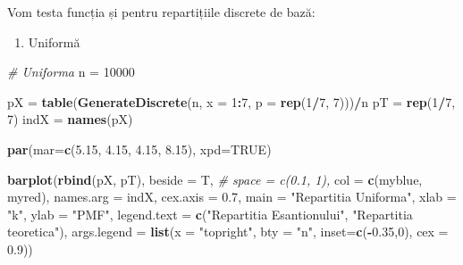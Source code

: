 \documentclass[]{article}
\newenvironment{Shaded}{\begin{snugshade}}{\end{snugshade}}
\newcommand{\KeywordTok}[1]{\textcolor[rgb]{0.13,0.29,0.53}{\textbf{#1}}}
\newcommand{\DataTypeTok}[1]{\textcolor[rgb]{0.13,0.29,0.53}{#1}}
\newcommand{\DecValTok}[1]{\textcolor[rgb]{0.00,0.00,0.81}{#1}}
\newcommand{\FloatTok}[1]{\textcolor[rgb]{0.00,0.00,0.81}{#1}}
\newcommand{\StringTok}[1]{\textcolor[rgb]{0.31,0.60,0.02}{#1}}
\newcommand{\CommentTok}[1]{\textcolor[rgb]{0.56,0.35,0.01}{\textit{#1}}}
\newcommand{\OtherTok}[1]{\textcolor[rgb]{0.56,0.35,0.01}{#1}}
\newcommand{\OperatorTok}[1]{\textcolor[rgb]{0.81,0.36,0.00}{\textbf{#1}}}
\newcommand{\NormalTok}[1]{#1}
\providecommand{\tightlist}{%
  \setlength{\itemsep}{0pt}\setlength{\parskip}{0pt}}
\begin{document}
Vom testa funcția și pentru repartițiile discrete de bază:

\begin{enumerate}
\def\labelenumi{\alph{enumi})}
\tightlist
\item
  Uniformă
\end{enumerate}

\begin{Shaded}
\begin{Highlighting}[]
\CommentTok{# Uniforma}
\NormalTok{n =}\StringTok{ }\DecValTok{10000}

\NormalTok{pX =}\StringTok{ }\KeywordTok{table}\NormalTok{(}\KeywordTok{GenerateDiscrete}\NormalTok{(n, }\DataTypeTok{x =} \DecValTok{1}\OperatorTok{:}\DecValTok{7}\NormalTok{, }
                      \DataTypeTok{p =} \KeywordTok{rep}\NormalTok{(}\DecValTok{1}\OperatorTok{/}\DecValTok{7}\NormalTok{, }\DecValTok{7}\NormalTok{)))}\OperatorTok{/}\NormalTok{n}
\NormalTok{pT =}\StringTok{ }\KeywordTok{rep}\NormalTok{(}\DecValTok{1}\OperatorTok{/}\DecValTok{7}\NormalTok{, }\DecValTok{7}\NormalTok{)}
\NormalTok{indX =}\StringTok{ }\KeywordTok{names}\NormalTok{(pX)}

\KeywordTok{par}\NormalTok{(}\DataTypeTok{mar=}\KeywordTok{c}\NormalTok{(}\FloatTok{5.15}\NormalTok{, }\FloatTok{4.15}\NormalTok{, }\FloatTok{4.15}\NormalTok{, }\FloatTok{8.15}\NormalTok{), }\DataTypeTok{xpd=}\OtherTok{TRUE}\NormalTok{)}

\KeywordTok{barplot}\NormalTok{(}\KeywordTok{rbind}\NormalTok{(pX, pT), }
        \DataTypeTok{beside =}\NormalTok{ T,}
        \CommentTok{# space = c(0.1, 1),}
        \DataTypeTok{col =} \KeywordTok{c}\NormalTok{(myblue, myred),}
        \DataTypeTok{names.arg =}\NormalTok{ indX, }
        \DataTypeTok{cex.axis =} \FloatTok{0.7}\NormalTok{, }
        \DataTypeTok{main =} \StringTok{"Repartitia Uniforma"}\NormalTok{,}
        \DataTypeTok{xlab =} \StringTok{"k"}\NormalTok{,}
        \DataTypeTok{ylab =} \StringTok{"PMF"}\NormalTok{,}
        \DataTypeTok{legend.text =} \KeywordTok{c}\NormalTok{(}\StringTok{"Repartitia Esantionului"}\NormalTok{, }\StringTok{"Repartitia teoretica"}\NormalTok{), }
        \DataTypeTok{args.legend =}  \KeywordTok{list}\NormalTok{(}\DataTypeTok{x =} \StringTok{"topright"}\NormalTok{, }\DataTypeTok{bty =} \StringTok{"n"}\NormalTok{, }
                            \DataTypeTok{inset=}\KeywordTok{c}\NormalTok{(}\OperatorTok{-}\FloatTok{0.35}\NormalTok{,}\DecValTok{0}\NormalTok{), }\DataTypeTok{cex =} \FloatTok{0.9}\NormalTok{))}
\end{Highlighting}
\end{Shaded}
\end{document}
